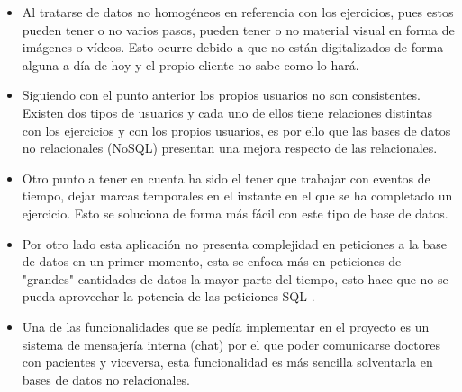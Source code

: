 \begin{itemize}
    \item Al tratarse de datos no homogéneos en referencia con los
    ejercicios, pues estos pueden tener o no varios pasos, pueden
    tener o no material visual en forma de imágenes o vídeos. Esto
    ocurre debido a que no están digitalizados de forma alguna a día
    de hoy y el propio cliente no sabe como lo hará.
    \item Siguiendo con el punto anterior los propios usuarios
    no son consistentes. Existen dos tipos de usuarios y cada
    uno de ellos tiene relaciones distintas
    con los ejercicios y con los propios usuarios, es por ello que
    las bases de datos no relacionales (NoSQL) presentan una mejora
    respecto de las relacionales.
    \item Otro punto a tener en cuenta ha sido el tener que trabajar
    con eventos de tiempo, dejar marcas temporales en el instante en
    el que se ha completado un ejercicio. Esto se soluciona de forma
    más fácil con este tipo de base de datos.
    \item Por otro lado esta aplicación no presenta complejidad en
    peticiones a la base de datos en un primer momento, esta se
    enfoca más en peticiones de "grandes" cantidades de datos la
    mayor parte del tiempo, esto hace que no se pueda aprovechar la
    potencia de las peticiones SQL \cite{sql}.
    \item Una de las funcionalidades que se pedía implementar en el
    proyecto es un sistema de mensajería interna (chat) por el que
    poder comunicarse doctores con pacientes y viceversa, esta
    funcionalidad es más sencilla solventarla en bases de datos no
    relacionales.
\end{itemize}
